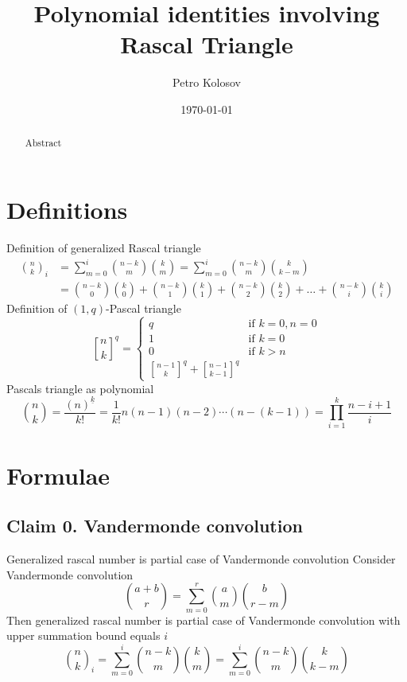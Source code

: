 \documentclass[12pt,letterpaper,oneside,reqno]{amsart}
\title[Polynomial identities involving Rascal Triangle]
{Polynomial identities involving Rascal Triangle}
\author[Petro Kolosov]{Petro Kolosov}
\date{\today}
\newcommand \fallingFactorial [2] {\left(#1 \right)^{\underline{#2}}}
\newcommand \rascalNumber [3] {\binom{#1}{#2}_{#3}}
\newcommand{\genstirlingI}[3]{%
    \genfrac{[}{]}{0pt}{#1}{#2}{#3}%
}
\newcommand{\oneQBinomial}[3]{\genstirlingI{}{#1}{#2}^{#3}}
\numberwithin{equation}{section}
\begin{document}
\begin{abstract}
    Abstract
\end{abstract}

\maketitle

\tableofcontents


\section{Definitions}
Definition of generalized Rascal triangle
\begin{align}
    \rascalNumber{n}{k}{i} &= \sum_{m=0}^{i} \binom{n-k}{m} \binom{k}{m} = \sum_{m=0}^{i} \binom{n-k}{m} \binom{k}{k-m} \\
    &= \binom{n-k}{0} \binom{k}{0} + \binom{n-k}{1} \binom{k}{1} + \binom{n-k}{2} \binom{k}{2} + \ldots + \binom{n-k}{i} \binom{k}{i}
\end{align}
Definition of $(1, q)$-Pascal triangle
\begin{equation*}
    \oneQBinomial{n}{k}{q} =
    \begin{cases}
        q & \text{if } k=0, n=0 \\
        1 & \text{if } k=0 \\
        0 & \text{if } k > n \\
        \oneQBinomial{n-1}{k}{q} + \oneQBinomial{n-1}{k-1}{q}
    \end{cases}
\end{equation*}
Pascals triangle as polynomial
\begin{equation}
    \binom{n}{k}= \frac{\fallingFactorial{n}{k}}{k!}= \frac{1}{k!} n(n-1)(n-2)\cdots (n-(k-1)) = \prod_{i=1}^{k} \frac{n-i+1}{i}
\end{equation}


\section{Formulae}\label{sec:formulae}

\subsection{Claim 0. Vandermonde convolution} Generalized rascal number is partial case of Vandermonde convolution
Consider Vandermonde convolution
\begin{equation*}
    \binom{a+b}{r} = \sum_{m=0}^{r} \binom{a}{m} \binom{b}{r-m}
\end{equation*}
Then generalized rascal number is partial case of Vandermonde convolution with upper summation bound equals $i$
\begin{equation*}
    \rascalNumber{n}{k}{i} = \sum_{m=0}^{i} \binom{n-k}{m} \binom{k}{m} = \sum_{m=0}^{i} \binom{n-k}{m} \binom{k}{k-m}
\end{equation*}
\end{document}
